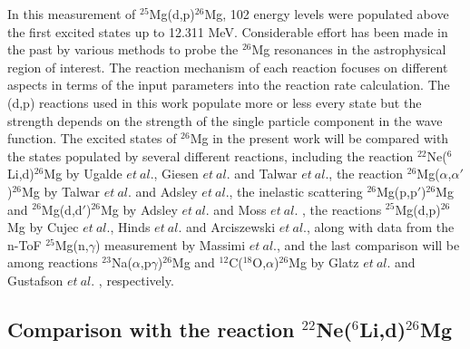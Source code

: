 In this measurement of $^{25}$Mg(d,p)$^{26}$Mg, 102 energy levels were populated above the first excited states up to 12.311 MeV.
Considerable effort has been made in the past by various methods to probe the $^{26}$Mg resonances in the astrophysical region of interest. The reaction mechanism of each reaction  focuses on different aspects in terms of the input parameters into the  reaction rate calculation.
The (d,p) reactions used in this work populate more or less every state but the strength depends on the strength of the single particle component in the wave function.
The excited states of $^{26}$Mg in the present work will be compared with  the states populated by several different reactions, including
the reaction $^{22}$Ne($^6$Li,d)$^{26}$Mg by Ugalde $et\ al.$\citep{Ugalde2007}, Giesen $et\ al.$\citep{GIESEN199395} and Talwar $et\ al.$\citep{Rashi2016},
the reaction $^{26}$Mg($\alpha$,$\alpha'$)$^{26}$Mg by Talwar $et\ al.$\citep{Rashi2016} and Adsley $et\ al.$\citep{26mgaa2017},
the inelastic scattering $^{26}$Mg(p,p$'$)$^{26}$Mg and  $^{26}$Mg(d,d$'$)$^{26}$Mg by Adsley $et\ al.$\citep{26mgdd2018} and Moss $et\ al.$ \citep{Moss1967},
the reactions $^{25}$Mg(d,p)$^{26}$Mg by Cujec $et\ al.$\citep{Cujec1964}, Hinds $et\ al.$\citep{Hinds1965}\citep{Hinds1961} and Arciszewski $et\ al.$\citep{Arciszewski1984}, along with data from the n-ToF $^{25}$Mg(n,$\gamma$) measurement by Massimi $et\ al.$\citep{Massimi}\citep{MASSIMI2017},
and the last comparison will be among reactions $^{23}$Na($\alpha$,p$\gamma$)$^{26}$Mg and $^{12}$C($^{18}$O,$\alpha$)$^{26}$Mg by Glatz $et\ al.$\citep{Glatz1986} and Gustafson $et\ al.$ \citep{Gustafson1976}, respectively.





\subsection{Comparison with the  reaction $^{22}$Ne($^6$Li,d)$^{26}$Mg}

